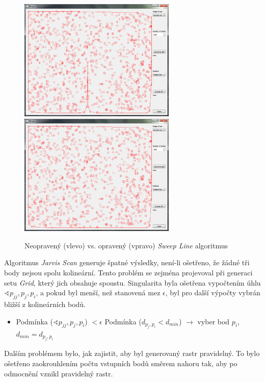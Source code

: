 \documentclass[a4paper, 12pt]{article}
\begin{document}
\begin{figure} [h!]
    \centering
      \includegraphics[width=7.5cm]{./pictures/app_sweep_wrong.png}
      \includegraphics[width=7.5cm]{./pictures/app_sweep_right.png}
      \caption{Neopravený (vlevo) vs. opravený (vpravo) \textit{Sweep Line} algoritmus}
\end{figure}

Algoritmus \textit{Jarvis Scan} generuje špatné výsledky, není-li ošetřeno, že žádné tři body nejsou spolu kolineární. Tento problém se zejména projevoval při generaci setu \textit{Grid}, který jich obsahuje spoustu. Singularita byla ošetřena vypočtením úhlu $\sphericalangle p_{jj}, p_j, p_i$, a pokud byl menší, než stanovená mez $\epsilon$, byl pro další výpočty vybrán bližší z kolineárních bodů.

\begin{itemize}
\item Podmínka ($\sphericalangle p_{jj}, p_j, p_i$) $< \epsilon$
\subitem Podmínka ($d_{p_j,p_i} < d_{min}$) $\rightarrow$ vyber bod $p_i$, $d_{min} = d_{p_j,p_i}$
\end{itemize}

Dalším problémem bylo, jak zajistit, aby byl generovaný rastr pravidelný. To bylo ošetřeno zaokrouhlením počtu vstupních bodů směrem nahoru tak, aby po odmocnění vznikl pravidelný rastr.\\
\end{document}
